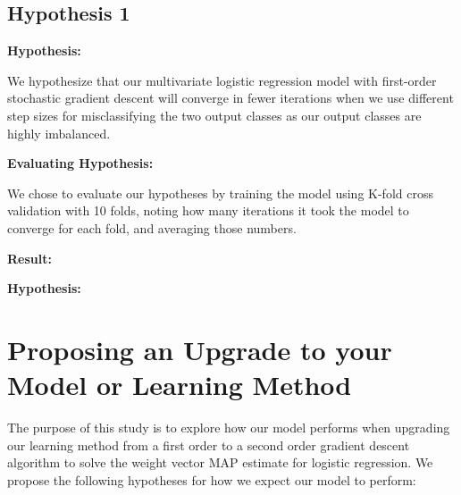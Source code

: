 \documentclass[12pt]{article}
\begin{document}
\subsection{Hypothesis 1}

\textbf{Hypothesis:} 

We hypothesize that our multivariate logistic regression model with first-order stochastic gradient descent will converge in fewer iterations when we use different step sizes for misclassifying the two output classes as our output classes are highly imbalanced.

\textbf{Evaluating Hypothesis:}

We chose to evaluate our hypotheses by training the model using K-fold cross validation with 10 folds, noting how many iterations it took the model to converge for each fold, and averaging those numbers.

\textbf{Result:}





\textbf{Hypothesis: }

\section{Proposing an Upgrade to your Model or Learning Method}

The purpose of this study is to explore how our model performs when upgrading our
learning method from a first order to a second order gradient descent algorithm to solve the
weight vector MAP estimate for logistic regression. We propose the following hypotheses
for how we expect our model to perform:
\end{document}

